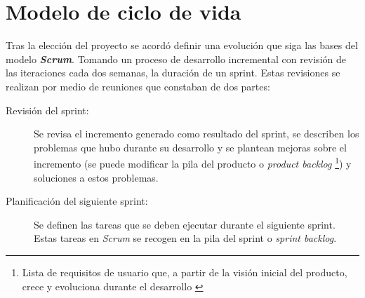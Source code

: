 \section{Modelo de ciclo de vida}

Tras la elección del proyecto se acordó definir una evolución que siga las bases del modelo \textit{\textbf{Scrum}}. Tomando un proceso de desarrollo incremental con revisión de las iteraciones cada dos semanas, la duración de un sprint. Estas revisiones se realizan por medio de reuniones que constaban de dos partes:
\begin{description}
	\item [Revisión del sprint:] Se revisa el incremento generado como resultado del sprint, se describen los problemas que hubo durante su desarrollo y se plantean mejoras sobre el incremento (se puede modificar la pila del producto o \textit{product backlog} \footnote{Lista de requisitos de usuario que, a partir de la visión inicial del producto, crece y evoluciona durante el desarrollo \cite{noauthor_scrum_2019}}) y soluciones a estos problemas.
	\item [Planificación del siguiente sprint:] Se definen las tareas que se deben ejecutar durante el siguiente sprint. Estas tareas en \textit{Scrum} se recogen en la pila del sprint o \textit{sprint backlog}.
\end{description}


